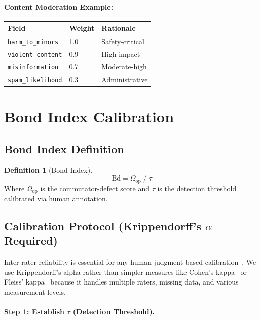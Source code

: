 \documentclass[11pt,letterpaper]{article}
\theoremstyle{definition}
\newtheorem{definition}[theorem]{Definition}
\theoremstyle{remark}
\begin{document}
\paragraph{Content Moderation Example:}
\begin{table}[h]
\centering
\begin{tabular}{@{}lll@{}}
\toprule
\textbf{Field} & \textbf{Weight} & \textbf{Rationale} \\
\midrule
\texttt{harm\_to\_minors} & 1.0 & Safety-critical \\
\texttt{violent\_content} & 0.9 & High impact \\
\texttt{misinformation} & 0.7 & Moderate-high \\
\texttt{spam\_likelihood} & 0.3 & Administrative \\
\bottomrule
\end{tabular}
\end{table}


\section{Bond Index Calibration}

\subsection{Bond Index Definition}

\begin{definition}[Bond Index]
\label{def:bond-index}
\[
\mathrm{Bd} = \Omega_{\mathrm{op}} \;/\; \tau
\]
Where $\Omega_{\mathrm{op}}$ is the commutator-defect score and $\tau$ is the detection threshold calibrated via human annotation.
\end{definition}

\subsection{Calibration Protocol (Krippendorff's $\alpha$ Required)}

Inter-rater reliability is essential for any human-judgment-based calibration~\cite{krippendorff2004}. We use Krippendorff's alpha rather than simpler measures like Cohen's kappa~\cite{cohen1960} or Fleiss' kappa~\cite{fleiss1971} because it handles multiple raters, missing data, and various measurement levels.

\paragraph{Step 1: Establish $\tau$ (Detection Threshold).}
\end{document}

